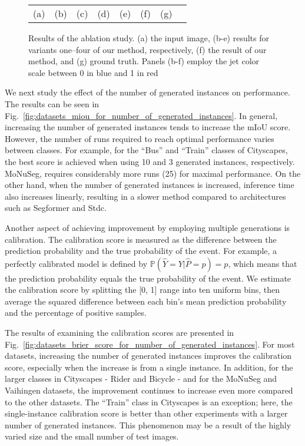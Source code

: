 \documentclass[10pt,twocolumn,letterpaper]{article}
\begin{document}
\begin{figure*}[t]
\begin{tabular}{@{}c@{~}c@{~}c@{~}c@{~}c@{~}c@{~}c@{~}c@{}}
(a) & (b) & (c) & (d) & (e) & (f) & (g)\\
\end{tabular}

\caption{Results of the ablation study. (a) the input image, (b-e) results for variants one--four of our method, respectively, (f) the result of our method, and (g) ground truth.  Panels (b-f) employ the jet color scale between 0 in blue and 1 in red}
\label{fig:ablation_figures}
\end{figure*}

We next study the effect of the number of generated instances on performance. The results can be seen in Fig.~\ref{fig:datasets_miou_for_number_of_generated_instances}. In general, increasing the number of generated instances tends to increase the mIoU score. However, the number of runs required to reach optimal performance varies between classes. For example, for the ``Bus'' and ``Train'' classes of Cityscapes, the best score is achieved when using 10 and 3 generated instances, respectively. MoNuSeg, requires considerably more runs (25) for maximal performance. On the other hand, when the number of generated instances is increased, inference time also increases linearly, resulting in a slower method compared to architectures such as Segformer and Stdc.

Another aspect of achieving improvement by employing multiple generations is calibration. The calibration score is measured as the difference between the prediction probability and the true probability of the event. For example, a perfectly calibrated model is defined by $\mathbb{P}(\hat{Y} = Y | \hat{P} = p) = p$, which means that the prediction probability equals the true probability of the event. We estimate the calibration score by splitting the [0, 1] range into ten uniform bins, then average the squared difference between each bin's mean prediction probability and the percentage of positive samples. 

The results of examining the calibration scores are presented in Fig.~\ref{fig:datasets_brier_score_for_number_of_generated_instances}. For most datasets, increasing the number of generated instances improves the calibration score, especially when the increase is from a single instance. In addition, for the larger classes in Cityscapes - Rider and Bicycle - and for the MoNuSeg and Vaihingen datasets, the improvement continues to increase even more compared to the other datasets. The ``Train'' class in Cityscapes is an exception; here, the single-instance calibration score is better than other experiments with a larger number of generated instances. This phenomenon may be a result of the highly varied size and the small number of test images. 
\end{document}
